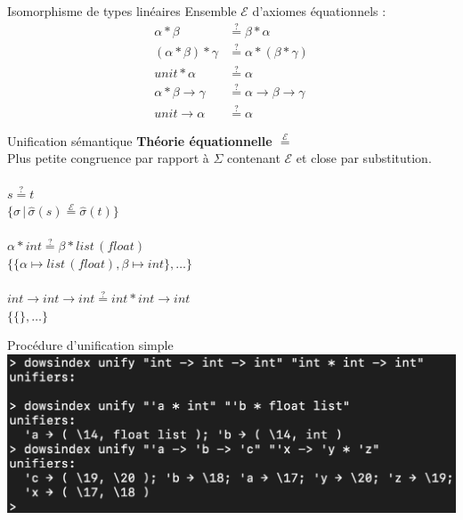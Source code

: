\documentclass[serif]{beamer}
\newcommand{\?}{\stackrel{?}{=}}
\begin{document}
\begin{frame}{Isomorphisme de types linéaires}
	\large
	Ensemble $\mathscr E$ d'axiomes équationnels :
	\begin{align*}
		\alpha * \beta &\? \beta * \alpha \tag {Com-2} \\
		(\alpha * \beta) * \gamma &\? \alpha * (\beta * \gamma) \tag {Ass-2} \\
		unit * \alpha &\? \alpha \tag {Ass-0} \\
		\alpha * \beta \rightarrow \gamma &\? \alpha \rightarrow \beta \rightarrow \gamma \tag {Cur-2} \\
		unit \rightarrow \alpha &\? \alpha \tag {Cur-0}
	\end{align*}
\end{frame}


\begin{frame}{Unification sémantique}
	\textbf {Théorie équationnelle $\stackrel{\mathscr E}{=}$} \\
	Plus petite congruence par rapport à $\Sigma$ contenant $\mathscr E$ et close par substitution.
	~\\~\\
	\centering
	$s \? t$ \\
	$\{ \sigma \,|\, \hat \sigma (s) \stackrel{\mathscr E}{=} \hat \sigma (t) \}$ \\
	~\\
	$\alpha * int \? \beta * list\,(float)$ \\
	$\{ \{\alpha \mapsto list\,(float), \beta \mapsto int\}, \dots \}$ \\
	~\\
	$int \rightarrow int \rightarrow int \? int * int \rightarrow int$ \\
	$\{\{\}, \dots \}$
\end{frame}


\begin{frame}{Procédure d'unification simple}
	\includegraphics[scale=0.3,center]{images/unify.png}
\end{frame}
\end{document}
